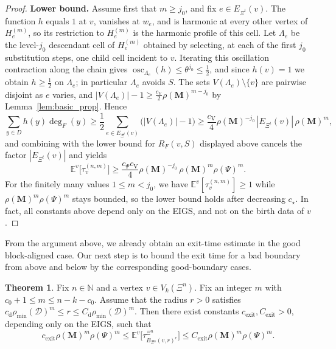 \documentclass{article}
\theoremstyle{plain}
\theoremstyle{definition}
\newtheorem{theorem}{Theorem}[section]
\newcommand{\dist}{\mathrm{d}}
\begin{document}
\begin{proof}
\textbf{Lower bound.}
Assume first that $m\ge j_0$, and fix $e\in E_{\Xi^{t}}(v)$.
The function $h$ equals $1$ at $v$, vanishes at $w_e$, and is harmonic at every other vertex of $H_e^{(m)}$, so its restriction to $H_e^{(m)}$ is the harmonic profile of this cell.
Let $\Lambda_e$ be the level-$j_0$ descendant cell of $H_e^{(m)}$ obtained by selecting, at each of the first $j_0$ substitution steps, one child cell incident to $v$.
Iterating this oscillation contraction along the chain gives $\operatorname{osc}_{\Lambda_e}(h)\le\theta^{j_0}\le\tfrac12$, and since $h(v)=1$ we obtain $h\ge\tfrac12$ on $\Lambda_e$; in particular $\Lambda_e$ avoids $S$.
The sets $V(\Lambda_e)\setminus\{v\}$ are pairwise disjoint as $e$ varies, and $|V(\Lambda_e)|-1\ge\tfrac{c_{\mathrm V}}{2}\rho(\mathbf M)^{m-j_0}$ by Lemma~\ref{lem:basic_prop}.
Hence
\[
\sum_{y\in D}h(y)\deg_F(y)
\ge
\frac{1}{2}\sum_{e\in E_{\Xi^{t}}(v)}\big(|V(\Lambda_e)|-1\big)
\ge
\frac{c_{\mathrm V}}{4}\rho(\mathbf M)^{-j_0}\,|E_{\Xi^{t}}(v)|\,\rho(\mathbf M)^m,
\]
and combining with the lower bound for $R_F(v,S)$ displayed above cancels the factor $|E_{\Xi^{t}}(v)|$ and yields
\[
\mathbb E^v\big[\tau_v^{(n,m)}\big]
\ge
\frac{c_{\Psi}c_{\mathrm V}}{4}\rho(\mathbf M)^{-j_0}\,\rho(\mathbf M)^m\rho(\Psi)^m.
\]
For the finitely many values $1\le m<j_0$, we have $\mathbb E^v[\tau_v^{(n,m)}]\ge 1$ while $\rho(\mathbf M)^m\rho(\Psi)^m$ stays bounded, so the lower bound holds after decreasing $c_{\star}$.
In fact, all constants above depend only on the EIGS, and not on the birth data of $v$.%

\end{proof}

From the argument above, we already obtain an exit-time estimate in the good block-aligned case.
Our next step is to bound the exit time for a bad boundary from above and below by the corresponding good-boundary cases.

\begin{theorem}\label{thm:exit_time_scale}
Fix $n\in\mathbb N$ and a vertex $v\in V_k(\Xi^n)$.
Fix an integer $m$ with $c_0+1\le m\le n-k-c_0$.
Assume that the radius $r>0$ satisfies
$
c_{\dist}\rho_{\min}(\mathcal D)^m
\le
r
\le
C_{\dist}\rho_{\min}(\mathcal D)^m.
$
Then there exist constants $c_{\mathrm{exit}},C_{\mathrm{exit}}>0$, depending only on the EIGS, such that
\[
c_{\mathrm{exit}}\rho(\mathbf M)^m\rho(\Psi)^m
\le
\mathbb E^v\big[\tau_{B_{\Xi^n}(v,r)^{\mathrm c}}^{\Xi^n}\big]
\le
C_{\mathrm{exit}}\rho(\mathbf M)^m\rho(\Psi)^m.
\]
\end{theorem}
\end{document}
